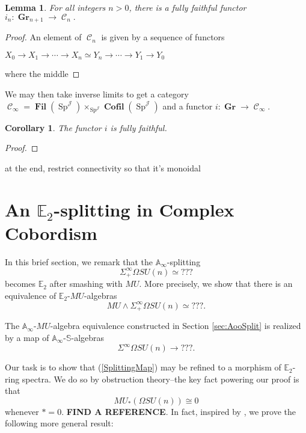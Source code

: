 \documentclass[reqno, oneside]{amsart}
\theoremstyle{definition}
\theoremstyle{plain}
\newtheorem{lem}[nul]{Lemma}
\newtheorem{cor}{Corollary}[nul]
\DeclareMathOperator{\smsh}{\wedge}
\DeclareMathOperator{\C}{\mathcal{C}}
\DeclareMathOperator{\Gr}{\textbf{Gr}}
\DeclareMathOperator{\Fil}{\textbf{Fil}}
\DeclareMathOperator{\Sp}{\text{Sp}}
\DeclareMathOperator{\J}{\mathcal{J}}
\DeclareMathOperator{\Cofil}{\textbf{Cofil}}
\begin{document}
\begin{lem}
For all integers $n>0$, there is a fully faithful functor $i_n:\Gr_{n+1} \to \C_n.$  
\end{lem}
\begin{proof}
An element of $\C_n$ is given by a sequence of functors 
\begin{center}
$X_0 \longrightarrow X_1 \longrightarrow \cdots \longrightarrow X_n \simeq Y_n \longrightarrow \cdots \longrightarrow Y_1 \longrightarrow Y_0$ 
\end{center}
where the middle 
\end{proof}

We may then take inverse limits to get a category $\C_\infty = \Fil(\Sp^{\J}) \times_{\Sp^{\J}} \Cofil(\Sp^{\J})$ and a functor $i: \Gr \to \C_\infty$. 

\begin{cor}
The functor $i$ is fully faithful.
\end{cor}
\begin{proof}
\end{proof}

at the end, restrict connectivity so that it's monoidal

\section{An \texorpdfstring{$\mathbb{E}_2$}{E2}-splitting in Complex Cobordism} \label{sec:MUE2}

In this brief section, we remark that the $\mathbb{A}_\infty$-splitting $$\Sigma^{\infty}_+ \Omega SU(n) \simeq ???$$ becomes $\mathbb{E}_2$ after smashing with $MU$.  More precisely, we show that there is an equivalence of $\mathbb{E}_2$-$MU$-algebras
$$MU \smsh \Sigma^{\infty}_+ \Omega SU(n) \simeq ???.$$

The $\mathbb{A}_\infty$-$MU$-algebra equivalence constructed in Section \ref{sec:AooSplit} is realized by a map of $\mathbb{A}_\infty$-$\mathbb{S}$-algebras
\begin{equation} \label{SplittingMap}
\Sigma^{\infty} \Omega SU(n) \longrightarrow ???.
\end{equation}

Our task is to show that (\ref{SplittingMap}) may be refined to a morphism of $\mathbb{E}_2$-ring spectra.  We do so by obstruction theory--the key fact powering our proof is that 
$$MU_*\left(\Omega SU(n)\right) \cong 0$$
whenever $*=0$.  \textbf{FIND A REFERENCE}.  In fact, inspired by \cite{ChadwickMandell}, we prove the following more general result:
\end{document}
